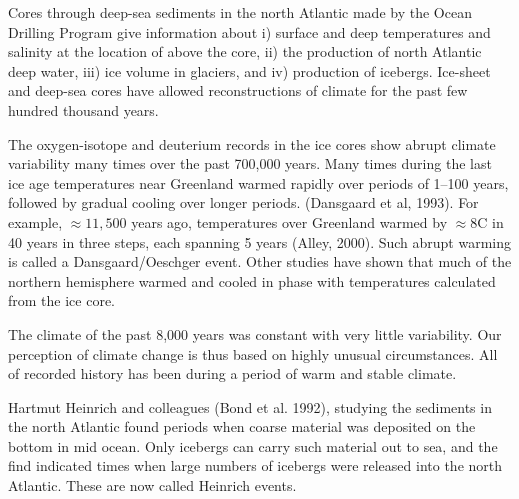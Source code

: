 Cores through deep-sea sediments in the north Atlantic made by the
Ocean Drilling Program give information about i) surface and deep
temperatures and salinity at the location of above the core, ii) the
production of north Atlantic deep water, iii) ice volume in glaciers,
and iv) production of icebergs. Ice-sheet and deep-sea cores have
allowed reconstructions of climate for the past few hundred thousand
years.

\begin{enumerate}
\vitem The oxygen-isotope and deuterium records in the ice cores show
abrupt climate variability many times over the past 700,000
years. Many times during the last ice age temperatures near Greenland
warmed rapidly over periods of 1--100 years, followed by gradual
cooling over longer periods. (Dansgaard et al, 1993). For example,
$\approx 11,500$ years ago, temperatures over Greenland warmed by
$\approx 8$\degrees C in 40 years in three steps, each spanning 5
years (Alley, 2000). Such abrupt warming is called a
Dansgaard/Oeschger event. Other
studies have shown that much of the northern hemisphere warmed and
cooled in phase with temperatures calculated from the ice core.

\vitem The climate of the past 8,000 years was constant with very
little variability. Our perception of climate change is thus based on
highly unusual circumstances. All of recorded history has been during
a period of warm and stable climate.

\vitem Hartmut Heinrich and colleagues (Bond et al. 1992), studying
the sediments in the north Atlantic found periods when coarse material
was deposited on the bottom in mid ocean. Only icebergs can carry such
material out to sea, and the find indicated times when large numbers
of icebergs were released into the north Atlantic. These are now
called Heinrich events.


\end{enumerate}
